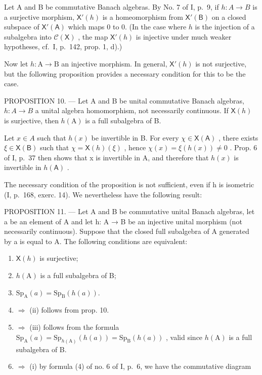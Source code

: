 Let A and B be commutative Banach algebras. By No. 7 of I, p.~9, if \(h\colon A\to B\) is a surjective morphism, \(\mathsf{X}'(h)\) is a homeomorphism from \(\mathsf{X}'(\mathsf{B})\) on a closed subspace of \(\mathsf{X}'(\mathsf{A})\) which maps 0 to 0. (In the case where \(h\) is the injection of a subalgebra into \(\mathcal{C}(\mathsf{X})\) , the map \(\mathsf{X}'(h)\) is injective under much weaker hypotheses, cf.~I, p.~142, prop. 1, d).)

Now let \(h \colon \mathrm{A} \to \mathrm{B}\) an injective morphism. In general, \(\mathsf{X}'(h)\) is not surjective, but the following proposition provides a necessary condition for this to be the case.

PROPOSITION 10. --- Let A and B be unital commutative Banach algebras, \(h\colon A\to B\) a unital algebra homomorphism, not necessarily continuous. If \(\mathsf{X}(h)\) is surjective, then \(h(\mathrm{A})\) is a full subalgebra of B.

Let \(x \in A\) such that \(h(x)\) be invertible in B. For every \(\chi \in \mathsf{X}(\mathsf{A})\) , there exists \(\xi \in \mathsf{X}(\mathsf{B})\) such that \(\chi = \mathsf{X}(h)(\xi)\) , hence \(\chi(x) = \xi(h(x)) \neq 0\) . Prop. 6 of I, p.~37 then shows that x is invertible in A, and therefore that \(h(x)\) is invertible in \(h(\mathsf{A})\) .

The necessary condition of the proposition is not sufficient, even if h is isometric (I, p.~168, exerc. 14). We nevertheless have the following result:

PROPOSITION 11. --- Let A and B be commutative unital Banach algebras, let a be an element of A and let h: A → B be an injective unital morphism (not necessarily continuous). Suppose that the closed full subalgebra of A generated by a is equal to A. The following conditions are equivalent:

\begin{enumerate}
\def\labelenumi{(\roman{enumi})}
\item
  \(\mathsf{X}(h)\) is surjective;
\item
  \(h(\mathrm{A})\) is a full subalgebra of B;
\item
  \(\mathrm{Sp}_{\mathrm{A}}(a)=\mathrm{Sp}_{\mathrm{B}}(h(a)).\)
\item
  \(\Longrightarrow\) (ii) follows from prop. 10.
\item
  \(\Longrightarrow\) (iii) follows from the formula \(\mathrm{Sp}_{\mathrm{A}}(a) = \mathrm{Sp}_{h(\mathrm{A})}(h(a)) = \mathrm{Sp}_{\mathrm{B}}(h(a))\) , valid since \(h(\mathrm{A})\) is a full subalgebra of B.
\item
  \(\Longrightarrow\) (i) by formula (4) of no. 6 of I, p.~6, we have the commutative diagram
\end{enumerate}

